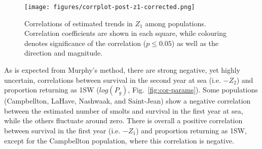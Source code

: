 \documentclass[12pt]{article}
\begin{document}
\begin{figure}[htbp] \centering
    \texttt{[image: figures/corrplot-post-z1-corrected.png]} \caption{
        Correlations of estimated trends in $Z_1$ among populations.
        Correlation coefficients are shown in each square, while colouring
        denotes significance of the correlation ($p \leq 0.05$) as well as the direction and magnitude.}
\label{fig:s1-corr}
\end{figure}
As is expected from Murphy's method, there are strong negative, yet highly uncertain, correlations
between survival in the second year at sea (i.e. $-Z_2$) and proportion returning
as 1SW ($log(P_g)$, Fig.~\ref{fig:cor-params}). Some populations (Campbellton,
LaHave, Nashwaak, and Saint-Jean) show a negative correlation between the
estimated number of smolts and survival in the first year at sea, while the
others fluctuate around zero. There is overall a positive correlation between
survival in the first year (i.e. $-Z_1$) and proportion returning as 1SW,
except for the Campbellton population, where this correlation is negative.
\end{document}
